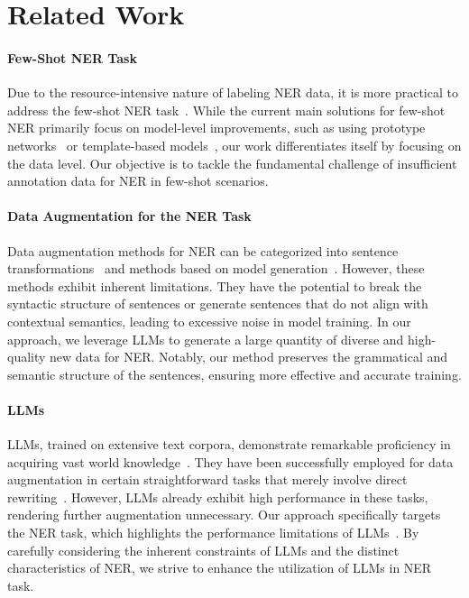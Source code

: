 \documentclass[11pt]{article}
\begin{document}
\section{Related Work}
\paragraph{Few-Shot NER Task}
Due to the resource-intensive nature of labeling NER data, it is more practical to address the few-shot NER task~\cite{huang2020few}. While the current main solutions for few-shot NER primarily focus on model-level improvements, such as using prototype networks~\cite{fritzler2019few} or template-based models~\cite{template_based,template_free}, our work differentiates itself by focusing on the data level. Our objective is to tackle the fundamental challenge of insufficient annotation data for NER in few-shot scenarios.

\paragraph{Data Augmentation for the NER Task}
Data augmentation methods for NER can be categorized into sentence transformations~\cite{EDA, LSMS} and methods based on model generation~\cite{DAGA, MELM}. However, these methods exhibit inherent limitations. They have the potential to break the syntactic structure of sentences or generate sentences that do not align with contextual semantics, leading to excessive noise in model training.
In our approach, we leverage LLMs to generate a large quantity of diverse and high-quality new data for NER. Notably, our method preserves the grammatical and semantic structure of the sentences, ensuring more effective and accurate training.




\paragraph{LLMs}
LLMs, trained on extensive text corpora, demonstrate remarkable proficiency in acquiring vast world knowledge~\cite{GPT,instructGPT, BLOOM, PaLM, LLaMA, Llama-2}. They have been successfully employed for data augmentation in certain straightforward tasks that merely involve direct rewriting~\cite{LAMBADA, DA-intent, Auggpt}. However, LLMs already exhibit high performance in these tasks, rendering further augmentation unnecessary.
Our approach specifically targets the NER task, which highlights the performance limitations of LLMs~\cite{GPT-chen, GPT-ye}. By carefully considering the inherent constraints of LLMs and the distinct characteristics of NER, we strive to enhance the utilization of LLMs in NER task.
\end{document}
